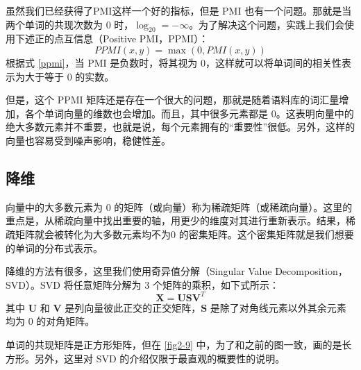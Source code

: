 虽然我们已经获得了PMI这样一个好的指标，但是 PMI 也有一个问题。那就是当两个单词的共现次数为 0 时，$\log_20 = -\infty$。为了解决这个问题，实践上我们会使用下述正的点互信息（Positive PMI，PPMI）：
\begin{equation}
    \label{ppmi}
    PPMI(x, y)=\max(0, PMI(x, y))
\end{equation}
根据式 \autoref{ppmi}，当 PMI 是负数时，将其视为 0，这样就可以将单词间的相关性表示为大于等于 0 的实数。

但是，这个 PPMI 矩阵还是存在一个很大的问题，那就是随着语料库的词汇量增加，各个单词向量的维数也会增加。而且，其中很多元素都是 0。这表明向量中的绝大多数元素并不重要，也就是说，每个元素拥有的“重要性”很低。另外，这样的向量也容易受到噪声影响，稳健性差。
\subsection{降维}
\begin{tcolorbox}
    向量中的大多数元素为 0 的矩阵（或向量）称为稀疏矩阵（或稀疏向量）。这里的重点是，从稀疏向量中找出重要的轴，用更少的维度对其进行重新表示。结果，稀疏矩阵就会被转化为大多数元素均不为0 的密集矩阵。这个密集矩阵就是我们想要的单词的分布式表示。
\end{tcolorbox}

降维的方法有很多，这里我们使用奇异值分解（Singular Value Decomposition，SVD）。SVD 将任意矩阵分解为 3 个矩阵的乘积，如下式所示：
\begin{equation}
    \bm{X}=\bm{U}\bm{S}\bm{V}^T
\end{equation}
其中 $\bm{U}$ 和 $\bm{V}$ 是列向量彼此正交的正交矩阵，$\bm{S}$ 是除了对角线元素以外其余元素均为 0 的对角矩阵。
\begin{tcolorbox}
    单词的共现矩阵是正方形矩阵，但在 \autoref{fig2-9} 中，为了和之前的图一致，画的是长方形。另外，这里对 SVD 的介绍仅限于最直观的概要性的说明。
\end{tcolorbox}
